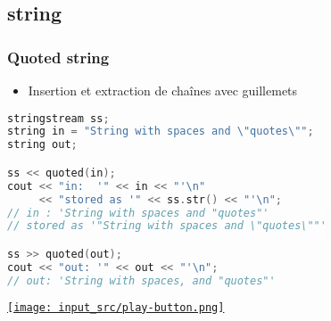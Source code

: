 \documentclass[C++.tex]{subfiles}
\begin{document}
\subsection*{string}
\begin{frame}[fragile]
	\frametitle{Quoted string}
	\begin{itemize}
		\item Insertion et extraction de chaînes avec guillemets
	\end{itemize}

	\begin{lstlisting}[language=C++]
stringstream ss;
string in = "String with spaces and \"quotes\"";
string out;

ss << quoted(in);
cout << "in:  '" << in << "'\n"
     << "stored as '" << ss.str() << "'\n";
// in : 'String with spaces and "quotes"'
// stored as '"String with spaces and \"quotes\""'

ss >> quoted(out);
cout << "out: '" << out << "'\n";
// out: 'String with spaces, and "quotes"'\end{lstlisting}


	\hfill
	\href{https://godbolt.org/#g:!((g:!((g:!((h:codeEditor,i:(filename:'1',fontScale:14,fontUsePx:'0',j:1,lang:c%2B%2B,selection:(endColumn:1,endLineNumber:18,positionColumn:1,positionLineNumber:18,selectionStartColumn:1,selectionStartLineNumber:18,startColumn:1,startLineNumber:18),source:'%23include+%3Ciostream%3E%0A%23include+%3Cstring%3E%0A%23include+%3Csstream%3E%0A%23include+%3Ciomanip%3E%0A%0Aint+main()%0A%7B%0A++std::stringstream+ss%3B%0A++std::string+in+%3D+%22String+with+spaces+and+%5C%22quotes%5C%22%22%3B%0A++std::string+out%3B%0A%0A++ss+%3C%3C+std::quoted(in)%3B%0A++std::cout+%3C%3C+%22in:++!'%22+%3C%3C+in+%3C%3C+%22!'%5Cn%22+%3C%3C+%22stored+as+!'%22+%3C%3C+ss.str()+%3C%3C+%22!'%5Cn%22%3B%0A%0A++ss+%3E%3E+std::quoted(out)%3B%0A++std::cout+%3C%3C+%22out:+!'%22+%3C%3C+out+%3C%3C+%22!'%5Cn%22%3B%0A%7D%0A'),l:'5',n:'0',o:'C%2B%2B+source+%231',t:'0')),k:50,l:'4',n:'0',o:'',s:0,t:'0'),(g:!((h:executor,i:(argsPanelShown:'1',compilationPanelShown:'0',compiler:g112,compilerOutShown:'0',execArgs:'',execStdin:'',fontScale:14,fontUsePx:'0',j:1,lang:c%2B%2B,libs:!((name:boost,ver:'175')),options:'-std%3Dc%2B%2B14',source:1,stdinPanelShown:'1',tree:'1',wrap:'0'),l:'5',n:'0',o:'Executor+x86-64+gcc+11.2+(C%2B%2B,+Editor+%231)',t:'0')),header:(),k:50,l:'4',n:'0',o:'',s:0,t:'0')),l:'2',n:'0',o:'',t:'0')),version:4}{\texttt{[image: input\_src/play-button.png]}}
\end{frame}
\end{document}
